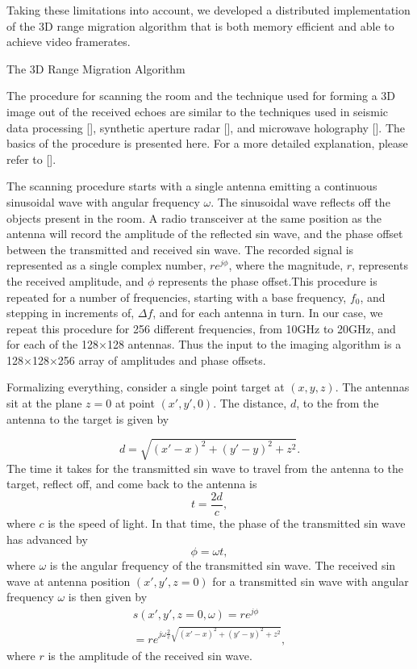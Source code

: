 \documentclass[twocolumn]{article}
\makeatletter
\def\section{\@startsection{section}{1}{\z@}{24pt plus 2 pt
minus 2 pt} {12pt plus 2pt minus 2pt}{\large\bf}}
\makeatother
\begin{document}
Taking these limitations into account, we developed a distributed implementation of the 3D range migration algorithm that is both memory efficient and able to achieve video framerates.

\section{The 3D Range Migration Algorithm}

The procedure for scanning the room and the technique used for forming a 3D image out of the received echoes are similar to the techniques used in seismic data processing [], synthetic aperture radar [], and microwave holography []. The basics of the procedure is presented here. For a more detailed explanation, please refer to [].

The scanning procedure starts with a single antenna emitting a continuous sinusoidal wave with angular frequency $\omega$. The sinusoidal wave reflects off the objects present in the room. A radio transceiver at the same position as the antenna will record the amplitude of the reflected sin wave, and the phase offset between the transmitted and received sin wave. The recorded signal is represented as a single complex number, $re^{j\phi}$, where the magnitude, $r$, represents the received amplitude, and $\phi$ represents the phase offset.This procedure is repeated for a number of frequencies, starting with a base frequency, $f_0$, and stepping in increments of, $\Delta f$, and for each antenna in turn. In our case, we repeat this procedure for 256 different frequencies, from 10GHz to 20GHz, and for each of the 128$\times$128 antennas. Thus the input to the imaging algorithm is a 128$\times$128$\times$256 array of amplitudes and phase offsets.

Formalizing everything, consider a single point target at $(x,y,z)$. The antennas sit at the plane $z=0$ at point $(x',y',0)$. The distance, $d$, to the from the antenna to the target is given by

\[
d=\sqrt{(x'-x)^{2}+(y'-y)^{2}+z^{2}}.
\]
The time it takes for the transmitted sin wave to travel from the antenna to the target, reflect off, and come back to the antenna is
 \[
t=\frac{2d}{c},
\]
where $c$ is the speed of light. In that time, the phase of the transmitted sin wave has advanced by
\[
\phi = \omega t,
\]
where $\omega$ is the angular frequency of the transmitted sin wave. The received sin wave at antenna position $(x',y',z=0)$ for a transmitted sin wave with angular frequency $\omega$ is then given by
\begin{gather}
s(x',y',z=0,\omega) = re^{j\phi} \\
	= re^{j \omega \frac{2}{c} \sqrt{(x'-x)^2 + (y'-y)^2 + z^2}},
\end{gather}
where $r$ is the amplitude of the received sin wave.
\end{document}
